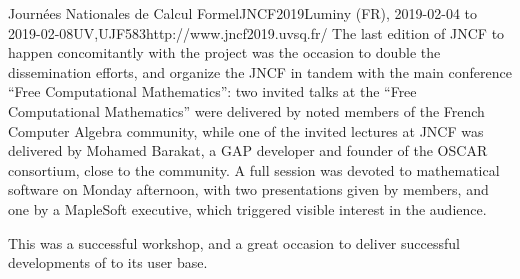 \begin{event}{Journées Nationales de Calcul Formel}{JNCF2019}{Luminy (FR),
  2019-02-04 to
  2019-02-08}{UV,UJF}{58}{3}{http://www.jncf2019.uvsq.fr/}
The last edition of JNCF to happen concomitantly with the project was
the occasion to double the dissemination efforts, and organize the
JNCF in tandem with the main \ODK conference ``Free Computational
Mathematics'': two invited talks at the ``Free Computational
Mathematics'' were delivered by noted members of the French Computer
Algebra community, while one of the invited lectures at JNCF was
delivered by Mohamed Barakat, a GAP developer and founder of the OSCAR
consortium, close to the \ODK community. A full session was devoted to
mathematical software on Monday afternoon, with two presentations
given by \ODK members, and one by a MapleSoft executive, which
triggered visible interest in the audience.

This was a successful workshop, and a great occasion to deliver 
successful developments of \ODK to its user base.
\end{event}
